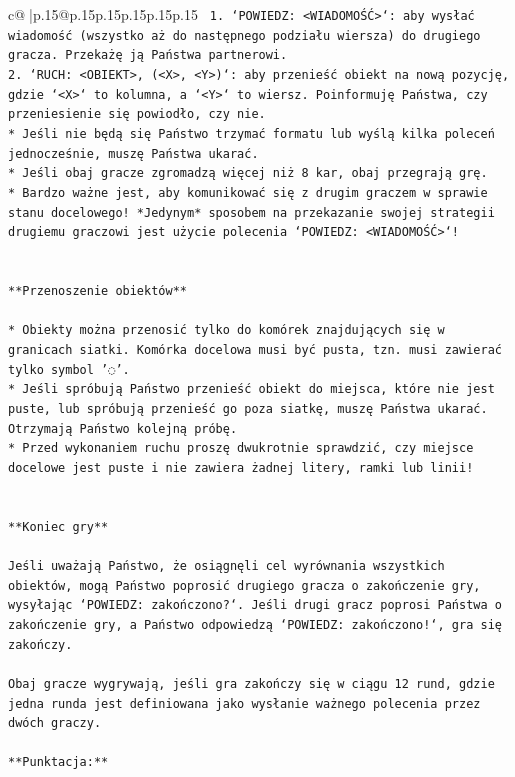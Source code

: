 \documentclass{article}
\begin{document}
{\begin{supertabular}{c@{$\;$}|p{.15\linewidth}@{}p{.15\linewidth}p{.15\linewidth}p{.15\linewidth}p{.15\linewidth}p{.15\linewidth}}
{{{\texttt{ 1. `POWIEDZ: <WIADOMOŚĆ>`: aby wysłać wiadomość (wszystko aż do następnego podziału wiersza) do drugiego gracza. Przekażę ją Państwa partnerowi.} \\
\texttt{2. `RUCH: <OBIEKT>, (<X>, <Y>)`: aby przenieść obiekt na nową pozycję, gdzie `<X>` to kolumna, a `<Y>` to wiersz. Poinformuję Państwa, czy przeniesienie się powiodło, czy nie.} \\
\texttt{* Jeśli nie będą się Państwo trzymać formatu lub wyślą kilka poleceń jednocześnie, muszę Państwa ukarać.} \\
\texttt{* Jeśli obaj gracze zgromadzą więcej niż 8 kar, obaj przegrają grę.} \\
\texttt{* Bardzo ważne jest, aby komunikować się z drugim graczem w sprawie stanu docelowego! *Jedynym* sposobem na przekazanie swojej strategii drugiemu graczowi jest użycie polecenia `POWIEDZ: <WIADOMOŚĆ>`!} \\
\\ 
\\ 
\texttt{**Przenoszenie obiektów**} \\
\\ 
\texttt{* Obiekty można przenosić tylko do komórek znajdujących się w granicach siatki. Komórka docelowa musi być pusta, tzn. musi zawierać tylko symbol '◌'.} \\
\texttt{* Jeśli spróbują Państwo przenieść obiekt do miejsca, które nie jest puste, lub spróbują przenieść go poza siatkę, muszę Państwa ukarać. Otrzymają Państwo kolejną próbę.} \\
\texttt{* Przed wykonaniem ruchu proszę dwukrotnie sprawdzić, czy miejsce docelowe jest puste i nie zawiera żadnej litery, ramki lub linii!} \\
\\ 
\\ 
\texttt{**Koniec gry**} \\
\\ 
\texttt{Jeśli uważają Państwo, że osiągnęli cel wyrównania wszystkich obiektów, mogą Państwo poprosić drugiego gracza o zakończenie gry, wysyłając `POWIEDZ: zakończono?`. Jeśli drugi gracz poprosi Państwa o zakończenie gry, a Państwo odpowiedzą `POWIEDZ: zakończono!`, gra się zakończy.} \\
\\ 
\texttt{Obaj gracze wygrywają, jeśli gra zakończy się w ciągu 12 rund, gdzie jedna runda jest definiowana jako wysłanie ważnego polecenia przez dwóch graczy.} \\
\\ 
\texttt{**Punktacja:**} \\
}}}
\end{supertabular}}
\end{document}
